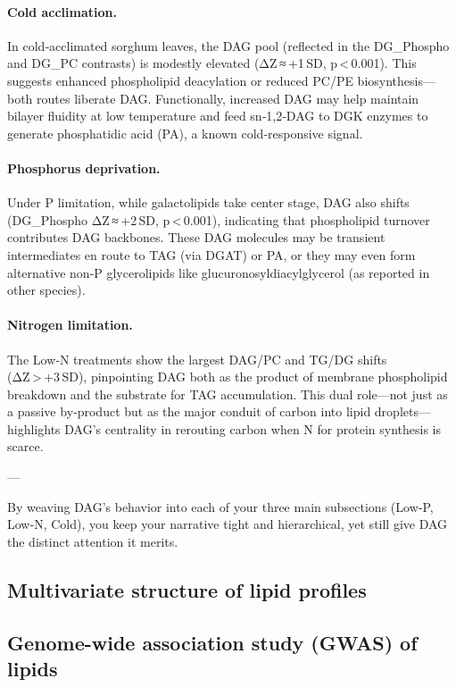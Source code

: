 \documentclass[10pt,letterpaper]{article}
\begin{document}
\paragraph{Cold acclimation.}  
In cold‑acclimated sorghum leaves, the DAG pool (reflected in the DG\_Phospho and DG\_PC contrasts) is modestly elevated (ΔZ ≈ +1 SD, p < 0.001). This suggests enhanced phospholipid deacylation or reduced PC/PE biosynthesis—both routes liberate DAG. Functionally, increased DAG may help maintain bilayer fluidity at low temperature and feed sn‑1,2‑DAG to DGK enzymes to generate phosphatidic acid (PA), a known cold‐responsive signal.

\paragraph{Phosphorus deprivation.}  
Under P limitation, while galactolipids take center stage, DAG also shifts (DG\_Phospho ΔZ ≈ +2 SD, p < 0.001), indicating that phospholipid turnover contributes DAG backbones. These DAG molecules may be transient intermediates en route to TAG (via DGAT) or PA, or they may even form alternative non‑P glycerolipids like glucuronosyldiacylglycerol (as reported in other species).

\paragraph{Nitrogen limitation.}  
The Low‑N treatments show the largest DAG/PC and TG/DG shifts (ΔZ > +3 SD), pinpointing DAG both as the product of membrane phospholipid breakdown and the substrate for TAG accumulation. This dual role—not just as a passive by‑product but as the major conduit of carbon into lipid droplets—highlights DAG’s centrality in rerouting carbon when N for protein synthesis is scarce.

---

By weaving DAG’s behavior into each of your three main subsections (Low‑P, Low‑N, Cold), you keep your narrative tight and hierarchical, yet still give DAG the distinct attention it merits.



\subsection*{Multivariate structure of lipid profiles}

\subsection*{Genome-wide association study (GWAS) of lipids}
\end{document}
